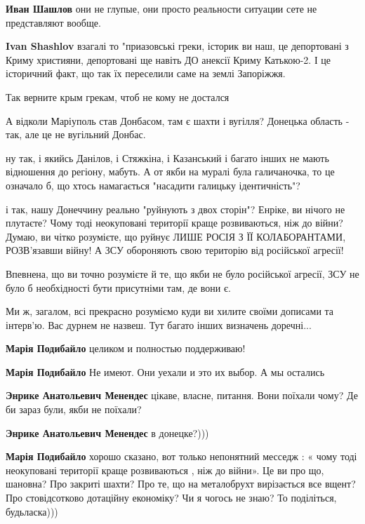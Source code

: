 \begin{itemize}
\begin{itemize}
\textbf{Иван Шашлов} они не глупые, они просто реальности ситуации сете не представляют вообще.

\textbf{Ivan Shashlov} взагалі то "приазовські греки, історик ви наш, це депортовані з Криму християни, депортовані ще навіть ДО анексії Криму Катькою-2. І це історичний факт, що так їх переселили саме на землі Запоріжжя.

Так верните крым грекам, чтоб не кому не достался

А відколи Маріуполь став Донбасом, там є шахти і вугілля? Донецька область - так, але це не вугільний Донбас.
\end{itemize} %


ну так, і якийсь Данілов, і Стяжкіна, і Казанський і багато інших не мають
відношення до регіону, мабуть. А от якби на муралі була галичаночка, то це
означало б, що хтось намагається "насадити галицьку ідентичність"?

і так, нашу Донеччину реально "руйнують з двох сторін"? Енріке, ви нічого не
плутаєте? Чому тоді неокуповані території краще розвиваються, ніж до війни?
Думаю, ви чітко розумієте, що руйнує ЛИШЕ РОСІЯ З ЇЇ КОЛАБОРАНТАМИ, РОЗВ'язавши
війну! А ЗСУ обороняють свою територію від російської агресії!

Впевнена, що ви точно розумієте й те, що якби не було російської агресії, ЗСУ
не було б необхідності бути присутніми там, де вони є.

Ми ж, загалом, всі прекрасно розуміємо куди ви хилите своїми дописами та
інтерв'ю. Вас дурнем не назвеш. Тут багато інших визначень доречні...

\begin{itemize} %
\textbf{Марія Подибайло} целиком и полностью поддерживаю!

\textbf{Марія Подибайло} Не имеют. Они уехали и это их выбор. А мы остались

\textbf{Энрике Анатольевич Менендес} цікаве, власне, питання. Вони поїхали чому? Де би зараз були, якби не поїхали?

\textbf{Энрике Анатольевич Менендес} в донецке?)))

\textbf{Марія Подибайло} хорошо сказано, вот только непонятний месседж : « чому тоді неокуповані території краще розвиваються , ніж до війни». Це ви про що, шановна? Про закриті шахти? Про те, що на металобрухт вирізається все вщент? Про стовідсотково дотаційну економіку? Чи я чогось не знаю? То поділіться, будьласка)))


\end{itemize}
\end{itemize}
